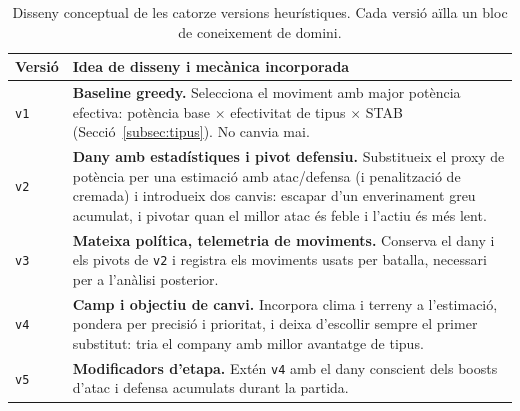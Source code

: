 \begin{table}[htbp]
    \centering
    \caption{Disseny conceptual de les catorze versions heurístiques. Cada versió aïlla un bloc de coneixement de domini.}
    \label{tab:heuristic_design}
    \small
    \renewcommand{\arraystretch}{1.5}
    \begin{tabularx}{\textwidth}{lX}
        \toprule
        \textbf{Versió} & \textbf{Idea de disseny i mecànica incorporada}                                                                                                                                                                                                                                                     \\
        \midrule
        \texttt{v1}     & \textbf{Baseline greedy.} Selecciona el moviment amb major potència efectiva: potència base $\times$ efectivitat de tipus $\times$ STAB (Secció~\ref{subsec:tipus}). No canvia mai.                                                                                                                 \\
        \arrayrulecolor{gray!30}\hline\arrayrulecolor{black}
        \texttt{v2}     & \textbf{Dany amb estadístiques i pivot defensiu.} Substitueix el proxy de potència per una estimació amb atac/defensa (i penalització de cremada) i introdueix dos canvis: escapar d'un enverinament greu acumulat, i pivotar quan el millor atac és feble i l'actiu és més lent.                   \\
        \arrayrulecolor{gray!30}\hline\arrayrulecolor{black}
        \texttt{v3}     & \textbf{Mateixa política, telemetria de moviments.} Conserva el dany i els pivots de \texttt{v2} i registra els moviments usats per batalla, necessari per a l'anàlisi posterior.                                                                                                                   \\
        \arrayrulecolor{gray!30}\hline\arrayrulecolor{black}
        \texttt{v4}     & \textbf{Camp i objectiu de canvi.} Incorpora clima i terreny a l'estimació, pondera per precisió i prioritat, i deixa d'escollir sempre el primer substitut: tria el company amb millor avantatge de tipus.                                                                                         \\
        \arrayrulecolor{gray!30}\hline\arrayrulecolor{black}
        \texttt{v5}     & \textbf{Modificadors d'etapa.} Extén \texttt{v4} amb el dany conscient dels boosts d'atac i defensa acumulats durant la partida.                                                                                                                                                                    \\

\end{tabularx}
\end{table}
